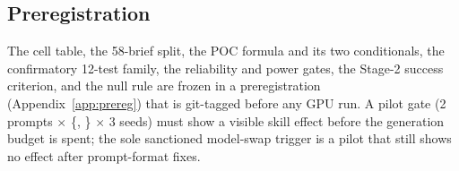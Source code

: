 \subsection{Preregistration}
The cell table, the 58-brief split, the POC formula and its two conditionals, the confirmatory
12-test family, the reliability and power gates, the Stage-2 success criterion, and the null
rule are frozen in a preregistration (Appendix~\ref{app:prereg}) that is git-tagged before any
GPU run. A pilot gate (2 prompts $\times$ \{\FULL, \NOSYS\} $\times$ 3 seeds) must show a visible
skill effect before the generation budget is spent; the sole sanctioned model-swap trigger is a
pilot that still shows no effect after prompt-format fixes.
